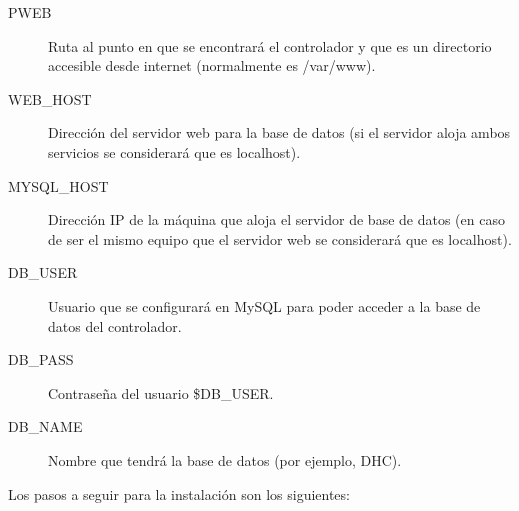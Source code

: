 \begin{description}
	\item[PWEB] Ruta al punto en que se encontrará el controlador y que es un directorio accesible desde internet (normalmente es /var/www).

	\item[WEB\_HOST] Dirección del servidor web para la base de datos (si el servidor aloja ambos servicios se considerará que es localhost).

	\item[MYSQL\_HOST] Dirección IP de la máquina que aloja el servidor de base de datos (en caso de ser el mismo equipo que el servidor web se considerará que es localhost).

	\item[DB\_USER] Usuario que se configurará en MySQL para poder acceder a la base de datos del controlador.

	\item[DB\_PASS] Contraseña del usuario \$DB\_USER.

	\item[DB\_NAME] Nombre que tendrá la base de datos (por ejemplo, DHC).
\end{description}

Los pasos a seguir para la instalación son los siguientes:


